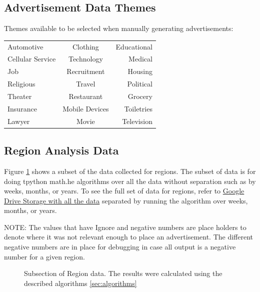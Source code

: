 \documentclass[titlepage,twocolumn]{article}
\begin{document}
\subsection{Advertisement Data Themes}
\label{app:adThemes}
\par Themes available to be selected when manually generating advertisements:
\begin{center}
\begin{tabular} { l c r}
	Automotive & Clothing & Educational \\ 
	Cellular Service & Technology & Medical \\
	Job & Recruitment & Housing \\
	Religious & Travel & Political \\
    Theater & Restaurant & Grocery \\ 
    Insurance & Mobile Devices & Toiletries \\
     Lawyer & Movie & Television \\
\end{tabular}
\end{center}

\onecolumn
\subsection{Region Analysis Data}
\label{seg:regionAnalysisData}
	\par Figure \ref{tab:subTableRegion} shows a subset of the data collected for regions. The subset of data is for doing tpython
	math.he algorithms over all the data without separation such as by weeks, months, or years. To see the full set of data for regions, refer to \href{https://docs.google.com/spreadsheets/d/1b-WJprSmBTCyujyXoT3wGxsx47cX5VVjYYHxUR9UrnU/edit?usp=sharing}{Google Drive Storage with all the data} separated by running the algorithm over weeks, months, or years.

\par NOTE: The values that have Ignore and negative numbers are place holders to denote where it was not relevant enough to place an advertisement. The different negative numbers are in place for debugging in case all output is a negative number for  a given region.

\begin{figure}[htbp]
	\centering
	
  \label{tab:subTableRegion}%
\caption{Subsection of Region data. The results were calculated using the described algorithms \ref{sec:algorithms} }
\end{figure}%
\end{document}
